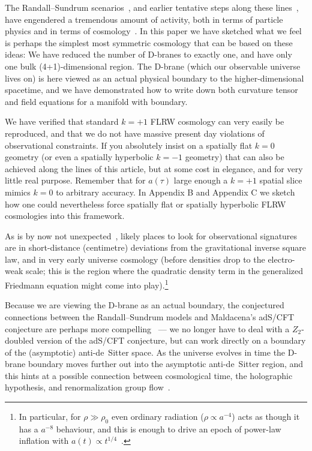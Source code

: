\documentclass[a4paper,12pt]{article}
\begin{document}
The Randall--Sundrum scenarios~\cite{RS1,RS2}, and earlier tentative
steps along these lines~\cite{Gogberashvili1}, have engendered a
tremendous amount of activity, both in terms of particle physics and
in terms of cosmology~\cite{Gogberashvili2,RS-cosmology}. In this
paper we have sketched what we feel is perhaps the simplest most
symmetric cosmology that can be based on these ideas: We have reduced
the number of D-branes to exactly one, and have only one bulk
(4+1)-dimensional region. The D-brane (which our observable universe
lives on) is here viewed as an actual physical boundary to the
higher-dimensional spacetime, and we have demonstrated how to write
down both curvature tensor and field equations for a manifold with
boundary.

We have verified that standard $k=+1$ FLRW cosmology can very easily
be reproduced, and that we do not have massive present day violations
of observational constraints.  If you absolutely insist on a spatially
flat $k=0$ geometry (or even a spatially hyperbolic $k=-1$ geometry)
that can also be achieved along the lines of this article, but at some
cost in elegance, and for very little real purpose. Remember that for
$a(\tau)$ large enough a $k=+1$ spatial slice mimics $k=0$ to
arbitrary accuracy. In Appendix B and Appendix C we sketch how one
could nevertheless force spatially flat or spatially hyperbolic FLRW
cosmologies into this framework.

As is by now not unexpected~\cite{RS1,RS2,RS-cosmology}, likely
places to look for observational signatures are in short-distance
(centimetre) deviations from the gravitational inverse square law, and
in very early universe cosmology (before densities drop to the
electro-weak scale; this is the region where the quadratic density
term in the generalized Friedmann equation might come into
play).\footnote{
In particular, for $\rho \gg \rho_0$ even ordinary radiation
($\rho\propto a^{-4}$) acts as though it has a $a^{-8}$ behaviour, and
this is enough to drive an epoch of power-law inflation with
$a(t)\propto t^{1/4}$~\cite{RS-cosmology}.}

Because we are viewing the D-brane as an actual boundary, the
conjectured connections between the Randall--Sundrum models and
Maldacena's adS/CFT conjecture are perhaps more
compelling~\cite{adS/CFT,RS-adS/CFT} --- we no longer have to deal
with a $Z_2$-doubled version of the adS/CFT conjecture, but can work
directly on a boundary of the (asymptotic) anti-de~Sitter space. As
the universe evolves in time the D-brane boundary moves further out
into the asymptotic anti-de~Sitter region, and this hints at a
possible connection between cosmological time, the holographic
hypothesis, and renormalization group flow~\cite{RS-adS/CFT}.
\end{document}
